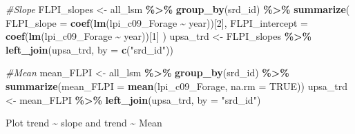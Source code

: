 \documentclass[
]{article}
\newenvironment{Shaded}{\begin{snugshade}}{\end{snugshade}}
\newcommand{\AttributeTok}[1]{\textcolor[rgb]{0.13,0.29,0.53}{#1}}
\newcommand{\CommentTok}[1]{\textcolor[rgb]{0.56,0.35,0.01}{\textit{#1}}}
\newcommand{\ConstantTok}[1]{\textcolor[rgb]{0.56,0.35,0.01}{#1}}
\newcommand{\DecValTok}[1]{\textcolor[rgb]{0.00,0.00,0.81}{#1}}
\newcommand{\FunctionTok}[1]{\textcolor[rgb]{0.13,0.29,0.53}{\textbf{#1}}}
\newcommand{\NormalTok}[1]{#1}
\newcommand{\OtherTok}[1]{\textcolor[rgb]{0.56,0.35,0.01}{#1}}
\newcommand{\SpecialCharTok}[1]{\textcolor[rgb]{0.81,0.36,0.00}{\textbf{#1}}}
\newcommand{\StringTok}[1]{\textcolor[rgb]{0.31,0.60,0.02}{#1}}
\begin{document}
\begin{Shaded}
\begin{Highlighting}[]
\CommentTok{\#Slope}
\NormalTok{FLPI\_slopes }\OtherTok{\textless{}{-}}\NormalTok{ all\_lsm }\SpecialCharTok{\%\textgreater{}\%}
  \FunctionTok{group\_by}\NormalTok{(srd\_id) }\SpecialCharTok{\%\textgreater{}\%}
  \FunctionTok{summarize}\NormalTok{(}
    \AttributeTok{FLPI\_slope =} \FunctionTok{coef}\NormalTok{(}\FunctionTok{lm}\NormalTok{(lpi\_c09\_Forage }\SpecialCharTok{\textasciitilde{}}\NormalTok{ year))[}\DecValTok{2}\NormalTok{],  }
    \AttributeTok{FLPI\_intercept =} \FunctionTok{coef}\NormalTok{(}\FunctionTok{lm}\NormalTok{(lpi\_c09\_Forage }\SpecialCharTok{\textasciitilde{}}\NormalTok{ year))[}\DecValTok{1}\NormalTok{] }
\NormalTok{  )}
\NormalTok{upsa\_trd }\OtherTok{\textless{}{-}}\NormalTok{ FLPI\_slopes }\SpecialCharTok{\%\textgreater{}\%}
  \FunctionTok{left\_join}\NormalTok{(upsa\_trd, }\AttributeTok{by =} \FunctionTok{c}\NormalTok{(}\StringTok{"srd\_id"}\NormalTok{))}

\CommentTok{\#Mean}
\NormalTok{mean\_FLPI }\OtherTok{\textless{}{-}}\NormalTok{ all\_lsm }\SpecialCharTok{\%\textgreater{}\%}
  \FunctionTok{group\_by}\NormalTok{(srd\_id) }\SpecialCharTok{\%\textgreater{}\%}
  \FunctionTok{summarize}\NormalTok{(}\AttributeTok{mean\_FLPI =} \FunctionTok{mean}\NormalTok{(lpi\_c09\_Forage, }\AttributeTok{na.rm =} \ConstantTok{TRUE}\NormalTok{))}
\NormalTok{upsa\_trd }\OtherTok{\textless{}{-}}\NormalTok{ mean\_FLPI }\SpecialCharTok{\%\textgreater{}\%}
  \FunctionTok{left\_join}\NormalTok{(upsa\_trd, }\AttributeTok{by =} \StringTok{"srd\_id"}\NormalTok{)}
\end{Highlighting}
\end{Shaded}

Plot trend \textasciitilde{} slope and trend \textasciitilde{} Mean
\end{document}
